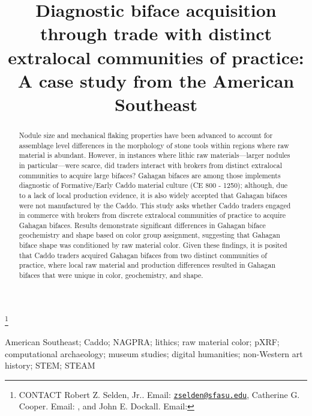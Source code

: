 \documentclass[]{interact}
\theoremstyle{plain}%
\theoremstyle{definition}
\theoremstyle{remark}
\begin{document}

\title{Diagnostic biface acquisition through trade with distinct
extralocal communities of practice: A case study from the American
Southeast}


\author{
}

\thanks{CONTACT Robert Z. Selden,
Jr.. Email: \href{mailto:zselden@sfasu.edu}{\nolinkurl{zselden@sfasu.edu}}, Catherine
G. Cooper. Email: , and John E. Dockall. Email: }

\maketitle

\begin{abstract}
Nodule size and mechanical flaking properties have been advanced to
account for assemblage level differences in the morphology of stone
tools within regions where raw material is abundant. However, in
instances where lithic raw materials---larger nodules in
particular---were scarce, did traders interact with brokers from
distinct extralocal communities to acquire large bifaces? Gahagan
bifaces are among those implements diagnostic of Formative/Early Caddo
material culture (CE 800 - 1250); although, due to a lack of local
production evidence, it is also widely accepted that Gahagan bifaces
were not manufactured by the Caddo. This study asks whether Caddo
traders engaged in commerce with brokers from discrete extralocal
communities of practice to acquire Gahagan bifaces. Results demonstrate
significant differences in Gahagan biface geochemistry and shape based
on color group assignment, suggesting that Gahagan biface shape was
conditioned by raw material color. Given these findings, it is posited
that Caddo traders acquired Gahagan bifaces from two distinct
communities of practice, where local raw material and production
differences resulted in Gahagan bifaces that were unique in color,
geochemistry, and shape.
\end{abstract}

\begin{keywords}
American Southeast; Caddo; NAGPRA; lithics; raw material color; pXRF;
computational archaeology; museum studies; digital humanities;
non-Western art history; STEM; STEAM
\end{keywords}
\end{document}
